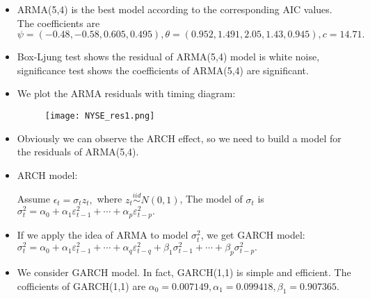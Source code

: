 \documentclass[10 pt]{beamer}
\begin{document}
\begin{frame}
	
	\begin{itemize}
		\item ARMA(5,4) is the best model according to the corresponding AIC values. The coefficients are $\psi = (-0.48, -0.58, 0.605, 0.495), \theta = (0.952, 1.491, 2.05, 1.43, 0.945), c = 14.71.$
		
		\item Box-Ljung test shows the residual of ARMA(5,4) model is white noise, significance test shows the coefficients of ARMA(5,4) are significant. 

	\end{itemize}
\end{frame}


\begin{frame}
	
	
	\begin{itemize}
		\item We plot the ARMA residuals with timing diagram:
		\begin {figure}[h]
		\centering
		\texttt{[image: NYSE\_res1.png]}
		\end {figure}
		\item Obviously we can observe the ARCH effect, so we need to build a model for the residuals of ARMA(5,4).
		
	\end{itemize}
\end{frame}




\begin{frame}


\begin{itemize}
	\item ARCH model:
	
	Assume $\epsilon_{t}=\sigma_{t} z_{t},$ where $z_{t} \overset{iid}\sim  N(0,1)$, The model of $\sigma_{t}$ is
	$\sigma_{t}^{2}=\alpha_{0}+\alpha_{1} \varepsilon_{t-1}^{2}+\cdots+\alpha_{p} \varepsilon_{t-p}^{2}.$
	
	\item If we apply the idea of ARMA to model $\sigma_{t}^{2}$, we get GARCH model:
	$\sigma_{t}^{2}=\alpha_{0}+\alpha_{1} \varepsilon_{t-1}^{2}+\cdots+\alpha_{q} \varepsilon_{t-q}^{2}+\beta_{1} \sigma_{t-1}^{2}+\cdots+\beta_{p} \sigma_{t-p}^{2}.$
	\item We consider GARCH model. In fact, GARCH(1,1) is simple and efficient. The cofficients of GARCH(1,1) are
	$\alpha_0 = 0.007149, \alpha_1 = 0.099418, \beta_1 =  0.907365.$
	
\end{itemize}
\end{frame}
\end{document}
